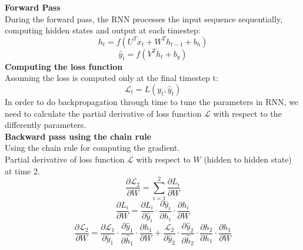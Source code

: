 \documentclass[12pt,a4paper]{article}
\begin{document}
\noindent \textbf{Forward Pass}\\
During the forward pass, the RNN processes the input sequence sequentially, computing hidden states and output at each timestep:
\begin{equation}
    h_t = f(U^Tx_{t}+W^Th_{t-1}+b_h)
\end{equation}
\begin{equation}
    \hat{y}_t = f(V^Th_t+b_y)
\end{equation}
\newline  %
\noindent \textbf{Computing the loss function}\\
Assuming the loss is computed only at the final timestep t:
\begin{equation}
    \mathcal{L}_t = L(y_t, \hat{y}_t)
\end{equation}
In order to do backpropagation through time to tune the parameters in RNN, we need to calculate the partial derivative of loss function $\mathcal{L}$ with respect to the differently parameters.\\
\newline  %
\noindent \textbf{Backward pass using the chain rule}\\
Using the chain rule for computing the gradient.\\
Partial derivative of loss function $\mathcal{L}$ with respect to $W$ (hidden to hidden state) at time 2. 
\begin{equation}
    \dfrac{\partial\mathcal{L}_2}{\partial{W}} = \sum_{i=1}^{2}\dfrac{\partial L_i}{\partial W}
\end{equation}
\begin{equation}
    \dfrac{\partial L_i}{\partial W} = \dfrac{\partial L_i}{\partial \hat{y}_i} \cdot \dfrac{\partial \hat{y}_i}{\partial h_i} \cdot \dfrac{\partial h_i}{\partial W}
\end{equation}
\begin{equation}
    \dfrac{\partial\mathcal{L}_2}{\partial W} = \dfrac{\partial\mathcal{L}_1}{\partial\hat{y}_1}\cdot\dfrac{\partial\hat{y}_1}{\partial\hat{h}_1}\cdot\dfrac{\partial h_1}{\partial W}+\dfrac{\mathcal{L}_2}{\partial\hat{y}_2}\cdot\dfrac{\partial\hat{y}_2}{\partial\hat{h}_2}\cdot\dfrac{\partial h_2}{\partial h_1}\cdot\dfrac{\partial h_1}{\partial W}
\end{equation}
\end{document}
